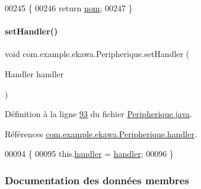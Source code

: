 \begin{DoxyCode}
00245     \{
00246         \textcolor{keywordflow}{return} \hyperlink{classcom_1_1example_1_1ekawa_1_1_peripherique_a0fb529bb80d55dd616821bce74a2af8c}{nom};
00247     \}
\end{DoxyCode}
\mbox{\label{classcom_1_1example_1_1ekawa_1_1_peripherique_a2cfa1b391efb3f2e7a78e761e965e7e3}} 
\paragraph{\texorpdfstring{set\+Handler()}{setHandler()}}
{\footnotesize\ttfamily void com.\+example.\+ekawa.\+Peripherique.\+set\+Handler (\begin{DoxyParamCaption}\item[{Handler}]{handler }\end{DoxyParamCaption})}



Définition à la ligne \hyperlink{_peripherique_8java_source_l00093}{93} du fichier \hyperlink{_peripherique_8java_source}{Peripherique.\+java}.



Références \hyperlink{_peripherique_8java_source_l00047}{com.\+example.\+ekawa.\+Peripherique.\+handler}.


\begin{DoxyCode}
00094     \{
00095         this.\hyperlink{classcom_1_1example_1_1ekawa_1_1_peripherique_ab6a0c0cae2eb087315d0d04d1cf6c3dc}{handler} = \hyperlink{classcom_1_1example_1_1ekawa_1_1_peripherique_ab6a0c0cae2eb087315d0d04d1cf6c3dc}{handler};
00096     \}
\end{DoxyCode}


\subsubsection{Documentation des données membres}
\mbox{\label{classcom_1_1example_1_1ekawa_1_1_peripherique_a2617309b5112a289fcd9f9570154341c}} 
